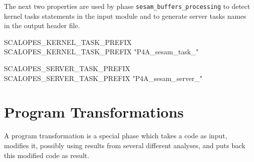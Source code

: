 \documentclass[a4paper]{report}
\newenvironment{PipsPass}[1]{\label{pass:#1}}{}
\begin{document}
The next two properties are used by phase
\texttt{sesam\_buffers\_processing} to detect kernel tasks statements
in the input module and to generate server tasks names in the output
header file.

\begin{PipsProp}{SCALOPES_KERNEL_TASK_PREFIX}
SCALOPES_KERNEL_TASK_PREFIX "P4A_sesam_task_"
\end{PipsProp}
\begin{PipsProp}{SCALOPES_SERVER_TASK_PREFIX}
SCALOPES_SERVER_TASK_PREFIX "P4A_sesam_server_"
\end{PipsProp}


\chapter{Program Transformations}
\label{section-program-transformations}

\begin{PipsPass}{TheTransformations}
A program transformation is a special phase which takes a code as
input, modifies it, possibly using results from several different
analyses, and puts back this modified code as result.
\end{PipsPass}
\end{document}
